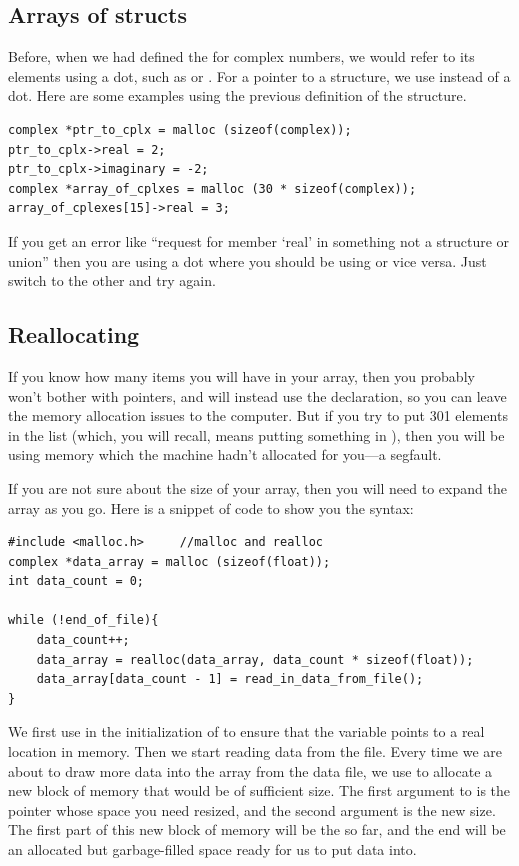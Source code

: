 \documentclass[12pt]{article}
\makeatletter
\def\ttind#1{\index{#1@\cinline{#1}}\cinline{#1}}
\makeatother
\begin{document}
\subsection{Arrays of structs}	
Before, when we had defined the \ttind{struct} for complex numbers, we would refer to its elements using a
dot, such as  or . For a pointer to a structure, we use \cinline{$->$} instead of 
a dot.  Here are some examples using the previous definition of the  structure.
\begin{lstlisting}
complex *ptr_to_cplx = malloc (sizeof(complex));
ptr_to_cplx->real = 2;
ptr_to_cplx->imaginary = -2;
complex *array_of_cplxes = malloc (30 * sizeof(complex));
array_of_cplexes[15]->real = 3;
\end{lstlisting}

If you get an error like ``request for member `real' in something not a structure or union'' then you are
using a dot where you should be using \ttind{$->$} or vice versa. Just switch to the other and try again.


\subsection{Reallocating} If you know how many items you will have
in your array, then you probably won't bother with pointers, and will
instead use the  declaration, so you can leave
the memory allocation issues to the computer. But if you try to put 301
elements in the list (which, you will recall, means putting something
in ), then you will be using memory which the
machine hadn't
allocated for you---a segfault.

If you are not sure about the size of your array, then you will need to
expand the array as you go. Here is a snippet of code to show you the syntax:
\begin{lstlisting}
#include <malloc.h>     //malloc and realloc
complex *data_array = malloc (sizeof(float));
int data_count = 0;

while (!end_of_file){
    data_count++;
    data_array = realloc(data_array, data_count * sizeof(float));
    data_array[data_count - 1] = read_in_data_from_file();
}
\end{lstlisting}

We first use  in the initialization of 
to ensure that the variable points to a real location in memory. Then
we start reading data from the file. Every time we are about to draw
more data into the array from the data file, we use \ttind{realloc} to
allocate a new block of memory that would be of sufficient size. The first
argument to  is the pointer whose space you need resized,
and the second argument is the new size.  The first part of this new
block of memory will be the  so far, and the end will
be an allocated but garbage-filled space ready for us to put data into.
\end{document}
